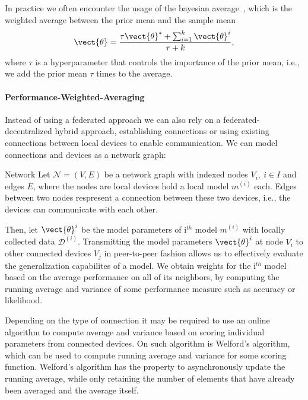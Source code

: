 In practice we often encounter the usage of the bayesian average~\cite{de2011bayesian}, which is the weighted average between the prior mean and the sample mean
\begin{equation}
    \vect{\theta} = \frac{\tau \vect{\theta}^* + \sum_{i=1}^k \vect{\theta}^i}{\tau + k},
\end{equation}
where $\tau$ is a hyperparameter that controls the importance of the prior mean, i.e., we add the prior mean $\tau$ times to the average. 

\paragraph*{Performance-Weighted-Averaging}

Instead of using a federated approach we can also rely on a federated-decentralized hybrid approach, establishing connections or using existing connections between local devices to enable communication.
We can model connections and devices as a network graph:
\begin{definition}{Network}
    Let $\mathcal{N} = (V, E)$ be a network graph with indexed nodes $V_i, \: i \in I$ and edges $E$, where the nodes are local devices hold a local model $m^{(i)}$ each.
    Edges between two nodes respresent a connection between these two devices, i.e., the devices can communicate with each other.
\end{definition}

Then, let $\vect{\theta}^{i}$ be the model parameters of i$^{th}$ model $m^{(i)}$ with locally collected data $\mathcal{D}^{(i)}$.
Transmitting the model parameters $\vect{\theta}^{i}$  at node $V_i$  to other connected devices  $V_j$ in peer-to-peer fashion allows us to effectively evaluate the generalization capabilites of a model.
We obtain weights for the i$^{th}$ model based on the average performance on all of its neighbors, by computing the running average and variance of some performance measure such as accuracy or likelihood.

Depending on the type of connection it may be required to use an online algorithm to compute average and variance based on scoring individual parameters from connected devices.
On such algorithm is Welford's algorithm, which can be used to compute running average and variance for some scoring function.
Welford's algorithm has the property to asynchronously update the running average, while only retaining the number of elements that have already been averaged and the average itself.

